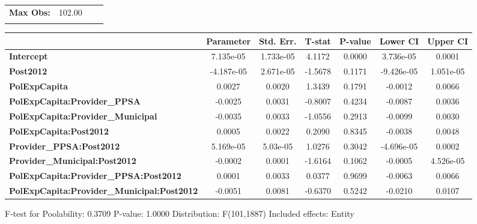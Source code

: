 \begin{center}
\begin{tabular}{lclc}
\textbf{Max Obs:}                                  &       102.00       & \textbf{                     }   &                  \\
\textbf{}                                          &                    & \textbf{                     }   &                  \\
\bottomrule
\end{tabular}
\begin{tabular}{lcccccc}
                                                   & \textbf{Parameter} & \textbf{Std. Err.} & \textbf{T-stat} & \textbf{P-value} & \textbf{Lower CI} & \textbf{Upper CI}  \\
\midrule
\textbf{Intercept}                                 &     7.135e-05      &     1.733e-05      &      4.1172     &      0.0000      &     3.736e-05     &       0.0001       \\
\textbf{Post2012}                                  &     -4.187e-05     &     2.671e-05      &     -1.5678     &      0.1171      &     -9.426e-05    &     1.051e-05      \\
\textbf{PolExpCapita}                              &       0.0027       &       0.0020       &      1.3439     &      0.1791      &      -0.0012      &       0.0066       \\
\textbf{PolExpCapita:Provider\_PPSA}               &      -0.0025       &       0.0031       &     -0.8007     &      0.4234      &      -0.0087      &       0.0036       \\
\textbf{PolExpCapita:Provider\_Municipal}          &      -0.0035       &       0.0033       &     -1.0556     &      0.2913      &      -0.0099      &       0.0030       \\
\textbf{PolExpCapita:Post2012}                     &       0.0005       &       0.0022       &      0.2090     &      0.8345      &      -0.0038      &       0.0048       \\
\textbf{Provider\_PPSA:Post2012}                   &     5.169e-05      &      5.03e-05      &      1.0276     &      0.3042      &     -4.696e-05    &       0.0002       \\
\textbf{Provider\_Municipal:Post2012}              &      -0.0002       &       0.0001       &     -1.6164     &      0.1062      &      -0.0005      &     4.526e-05      \\
\textbf{PolExpCapita:Provider\_PPSA:Post2012}      &       0.0001       &       0.0033       &      0.0377     &      0.9699      &      -0.0063      &       0.0066       \\
\textbf{PolExpCapita:Provider\_Municipal:Post2012} &      -0.0051       &       0.0081       &     -0.6370     &      0.5242      &      -0.0210      &       0.0107       \\
\bottomrule
\end{tabular}
\end{center}

F-test for Poolability: 0.3709 \newline
 P-value: 1.0000 \newline
 Distribution: F(101,1887) \newline
  \newline
 Included effects: Entity